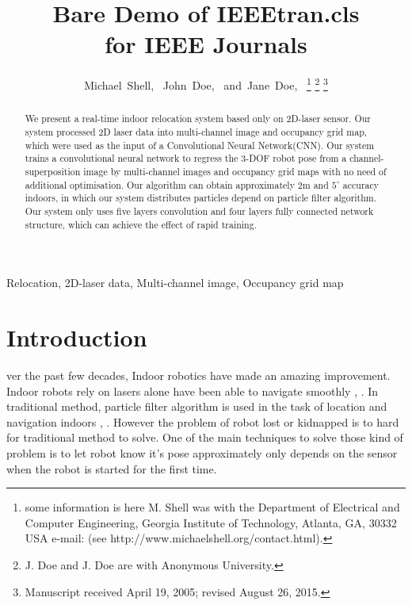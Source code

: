 \documentclass[journal]{IEEEtran}
\begin{document}
\title{Bare Demo of IEEEtran.cls\\ for IEEE Journals}

\author{Michael~Shell,~
        John~Doe,~
        and~Jane~Doe,~%
\thanks{ some information is here 
	M. Shell was with the Department
of Electrical and Computer Engineering, Georgia Institute of Technology, Atlanta,
GA, 30332 USA e-mail: (see http://www.michaelshell.org/contact.html).}%
\thanks{J. Doe and J. Doe are with Anonymous University.}%
\thanks{Manuscript received April 19, 2005; revised August 26, 2015.}}


\maketitle

\begin{abstract}
We present a real-time indoor relocation system based only on 2D-laser sensor. Our system processed 2D laser data into multi-channel image and occupancy grid map, which were used as the input of a Convolutional Neural Network(CNN). Our system trains a convolutional neural network to regress the 3-DOF robot pose from a channel-superposition image by  multi-channel images and occupancy grid maps with no need of additional optimisation. Our algorithm can obtain approximately 2m and $5^{\circ}$ accuracy indoors, in which our system distributes particles depend on particle filter algorithm. Our system only uses five layers convolution and four layers fully connected network structure, which can achieve the effect of rapid training.
\end{abstract}

\begin{IEEEkeywords}
Relocation, 2D-laser data,  Multi-channel image, Occupancy grid map
\end{IEEEkeywords}


\IEEEpeerreviewmaketitle

\section{Introduction}
ver the past few decades, Indoor robotics have made an amazing improvement. Indoor robots rely on lasers alone  have been able to navigate smoothly \cite{lingemann2005high}, \cite{csorba1997simultaneous}. In traditional method, particle filter algorithm is used in the task of location and navigation indoors \cite{fox1999monte}, \cite{aghili2016robust}. However the problem of robot lost or kidnapped is to hard for traditional method to solve. One of the main techniques to solve those kind of problem is to let robot know it's pose approximately only depends on the sensor when the robot is started for the first time. 
\end{document}
